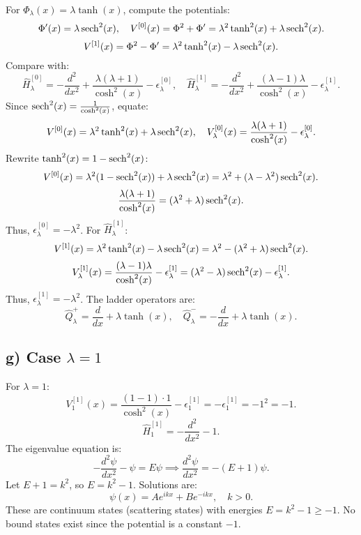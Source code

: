 \documentclass[a4paper,12pt]{article}
\begin{document}
For \(\Phi_\lambda(x) = \lambda \tanh(x)\), compute the potentials:
\[
\Phi'(x) = \lambda \sech^2(x), \quad V^{[0]}(x) = \Phi^2 + \Phi' = \lambda^2 \tanh^2(x) + \lambda \sech^2(x).
\]
\[
V^{[1]}(x) = \Phi^2 - \Phi' = \lambda^2 \tanh^2(x) - \lambda \sech^2(x).
\]
Compare with:
\[
\hat{H}_\lambda^{[0]} = -\frac{d^2}{dx^2} + \frac{\lambda (\lambda + 1)}{\cosh^2(x)} - \epsilon_\lambda^{[0]}, \quad \hat{H}_\lambda^{[1]} = -\frac{d^2}{dx^2} + \frac{(\lambda - 1) \lambda}{\cosh^2(x)} - \epsilon_\lambda^{[1]}.
\]
Since \(\sech^2(x) = \frac{1}{\cosh^2(x)}\), equate:
\[
V^{[0]}(x) = \lambda^2 \tanh^2(x) + \lambda \sech^2(x), \quad V_\lambda^{[0]}(x) = \frac{\lambda (\lambda + 1)}{\cosh^2(x)} - \epsilon_\lambda^{[0]}.
\]
Rewrite \(\tanh^2(x) = 1 - \sech^2(x)\):
\[
V^{[0]}(x) = \lambda^2 (1 - \sech^2(x)) + \lambda \sech^2(x) = \lambda^2 + (\lambda - \lambda^2) \sech^2(x).
\]
\[
\frac{\lambda (\lambda + 1)}{\cosh^2(x)} = (\lambda^2 + \lambda) \sech^2(x).
\]
Thus, \(\epsilon_\lambda^{[0]} = -\lambda^2\). For \(\hat{H}_\lambda^{[1]}\):
\[
V^{[1]}(x) = \lambda^2 \tanh^2(x) - \lambda \sech^2(x) = \lambda^2 - (\lambda^2 + \lambda) \sech^2(x).
\]
\[
V_\lambda^{[1]}(x) = \frac{(\lambda - 1) \lambda}{\cosh^2(x)} - \epsilon_\lambda^{[1]} = (\lambda^2 - \lambda) \sech^2(x) - \epsilon_\lambda^{[1]}.
\]
Thus, \(\epsilon_\lambda^{[1]} = -\lambda^2\). The ladder operators are:
\[
\hat{Q}_\lambda^+ = \frac{d}{dx} + \lambda \tanh(x), \quad \hat{Q}_\lambda^- = -\frac{d}{dx} + \lambda \tanh(x).
\]

\subsection*{g) Case \(\lambda = 1\)}

For \(\lambda = 1\):
\[
V_1^{[1]}(x) = \frac{(1-1) \cdot 1}{\cosh^2(x)} - \epsilon_1^{[1]} = -\epsilon_1^{[1]} = -1^2 = -1.
\]
\[
\hat{H}_1^{[1]} = -\frac{d^2}{dx^2} - 1.
\]
The eigenvalue equation is:
\[
-\frac{d^2 \psi}{dx^2} - \psi = E \psi \implies \frac{d^2 \psi}{dx^2} = -(E + 1) \psi.
\]
Let \(E + 1 = k^2\), so \(E = k^2 - 1\). Solutions are:
\[
\psi(x) = A e^{i k x} + B e^{-i k x}, \quad k > 0.
\]
These are continuum states (scattering states) with energies \(E = k^2 - 1 \geq -1\). No bound states exist since the potential is a constant \(-1\).
\end{document}
